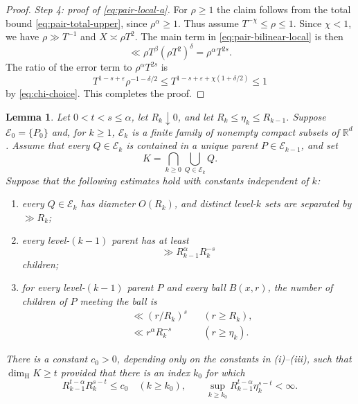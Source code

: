 \documentclass[11pt]{amsart}
\newtheorem{lemma}[theorem]{Lemma}
\newcommand{\R}{\mathbb R}
\newcommand{\eps}{\varepsilon}
\newcommand{\dimH}{\dim_{\mathrm H}}
\begin{document}
\begin{proof}
\medskip
\noindent\emph{Step 4: proof of \eqref{eq:pair-local-a}.}
For $\rho\ge1$ the claim follows from
the total bound \eqref{eq:pair-total-upper}, since $\rho^\alpha\ge1$.
Thus assume $T^{-\chi}\le\rho\le1$.  Since $\chi<1$, we have
$\rho\gg T^{-1}$ and $X\asymp\rho T^2$.  The main term in
\eqref{eq:pair-bilinear-local} is then
$$
 \ll \rho T^\beta(\rho T^2)^\delta
 =\rho^\alpha T^{2s}.
$$
The ratio of the error term to $\rho^\alpha T^{2s}$ is
$$
 T^{1-s+\eps}\rho^{-1-\delta/2}
 \le T^{1-s+\eps+\chi(1+\delta/2)}\le1
$$
by \eqref{eq:chi-choice}.  This completes the proof.
\end{proof}


\begin{lemma}\label{lem:mass-distribution}
Let $0<t<s\le\alpha$, let $R_k\downarrow0$, and let
$R_k\le\eta_k\le R_{k-1}$.  Suppose $\mathcal E_0=\{P_0\}$ and, for
$k\ge1$, $\mathcal E_k$ is a finite family of nonempty compact subsets of
$\R^d$.  Assume that every $Q\in\mathcal E_k$ is contained in a unique parent
$P\in\mathcal E_{k-1}$, and set
$$
 K=\bigcap_{k\ge0}\bigcup_{Q\in\mathcal E_k}Q.
$$
Suppose that the following estimates hold with constants independent of $k$:
\begin{enumerate}[label=\textup{(\roman*)}]
 \item every $Q\in\mathcal E_k$ has diameter $O(R_k)$, and distinct
 level-$k$ sets are separated by $\gg R_k$;
 \item every level-$(k-1)$ parent has at least
 \begin{equation}\label{eq:two-regime-child-lower}
  \gg R_{k-1}^\alpha R_k^{-s}
 \end{equation}
 children;
 \item for every level-$(k-1)$ parent $P$ and every ball $B(x,r)$, the
 number of children of $P$ meeting the ball is
 \begin{align}
  &\ll (r/R_k)^s &&(r\ge R_k),\label{eq:two-regime-local-s}\\
  &\ll r^\alpha R_k^{-s} &&(r\ge\eta_k).
  \label{eq:two-regime-local-a}
 \end{align}
\end{enumerate}
There is a constant $c_0>0$, depending only on the constants in
\textup{(i)}--\textup{(iii)}, such that $\dimH K\ge t$ provided that there is
an index $k_0$ for which
\begin{equation}\label{eq:mass-distribution-conditions}
 R_{k-1}^{t-\alpha}R_k^{s-t}\le c_0\quad(k\ge k_0),
 \qquad
 \sup_{k\ge k_0}R_{k-1}^{t-\alpha}\eta_k^{s-t}<\infty.
\end{equation}
\end{lemma}
\end{document}

